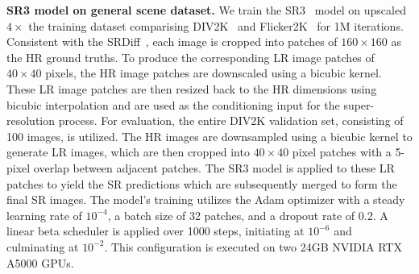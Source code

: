 \textbf{SR3 model on general scene dataset.} We train the SR3~\cite{saharia2022image} model on upscaled $4\times$ the training dataset comparising DIV2K~\cite{agustsson2017ntire} and Flicker2K~\cite{timofte2017ntire} for 1M iterations. Consistent with the SRDiff~\cite{li2022srdiff}, each image is cropped into patches 
of $160 \times 160$ as the HR ground truths. To produce the corresponding LR image patches of $40\times40$ pixels, the HR image patches are downscaled using a bicubic kernel. These LR image patches are then resized back to the HR dimensions using bicubic interpolation and are used as the conditioning input for the super-resolution process. For evaluation, the entire DIV2K validation set, consisting of 100 images, is utilized. The HR images are downsampled using a bicubic kernel to generate LR images, which are then cropped into $40\times40$ pixel patches with a 5-pixel overlap between adjacent patches. The SR3 model is applied to these LR patches to yield the SR predictions which are subsequently merged to form the final SR images. The model's training utilizes the Adam optimizer with a steady learning rate of $10^{-4}$, a batch size of 32 patches, and a dropout rate of 0.2. A linear beta scheduler is applied over 1000 steps, initiating at $10^{-6}$ and culminating at $10^{-2}$. This configuration is executed on two 24GB NVIDIA RTX A5000 GPUs.

